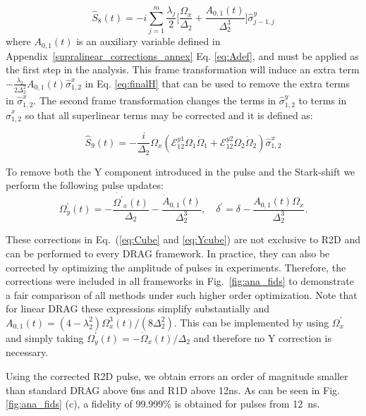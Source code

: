 \documentclass[superscriptaddress,amsmath,amssymb,aps,twocolumn,praplied,notitlepage]{revtex4-2}
\begin{document}
\begin{equation}
    \hat{S}_{8}(t) = -i\sum_{j=1}^{m} \frac{\lambda_j}{2}  \bigg[\frac{\Omega_x}{\Delta_2}+\frac{A_{0,1}(t)}{\Delta_2^3}\bigg] \hat{\sigma}^y_{j-1, j}
    \label{eq:Agenerator}
\end{equation}
where $A_{0,1}(t)$ is an auxiliary variable defined in  Appendix~\ref{supralinear_corrections_annex} Eq. \ref{eq:Adef}, and must be applied as the first step in the analysis. This frame transformation will induce an extra term $-\frac{\lambda_2}{2\Delta_2^2} A_{0,1}(t) \hat{\sigma}_{1,2}^x$ in Eq. \ref{eq:finalH} that can be used to remove the extra terms in $\hat{\sigma}_{1,2}^x$.
The second frame transformation changes the terms in $\hat{\sigma}_{1,2}^y$ to terms in $\hat{\sigma}_{1,2}^x$ so that all superlinear terms may be corrected and it is defined as:

\begin{equation}
    \hat{S}_{9}(t)=-\frac{i}{\Delta_2}\Omega_x(\mathcal{E}^{y1}_{12}\Omega_1\dot\Omega_1+\mathcal{E}^{y2}_{12}\Omega_2\dot\Omega_2)\hat{\sigma}_{1,2}^x
    \label{eq:Aswitch}
\end{equation}

To remove both the Y component introduced in the pulse and the Stark-shift we perform the following pulse updates:
\begin{equation}
    \Omega_y^{'}(t)=-\frac{\dot{\Omega^{'}}_x(t)}{\Delta_2}-\frac{\dot{A}_{0,1}(t)}{\Delta_2^3},\quad \delta^{'}=\delta-\frac{A_{0,1}(t)\Omega_x}{\Delta_2^3}.
    \label{eq:Ycube}
\end{equation}

These corrections in Eq.~(\ref{eq:Cube} and \ref{eq:Ycube}) are not exclusive to R2D and can be performed to every DRAG framework. In practice, they can also be corrected by optimizing the amplitude of pulses in experiments. Therefore, the corrections were included in all frameworks in Fig.~\ref{fig:ana_fids} to demonstrate a fair comparison of all methods under such higher order optimization. Note that for linear DRAG these expressions simplify substantially and $A_{0,1}(t)= (4-\lambda_2^2)\Omega_x^3(t)/(8\Delta_2^2)$. This can be implemented by using $\Omega_x^{'}$ and simply taking $\Omega_y^{'}(t)=-\dot{\Omega}_x(t)/\Delta_2$ and therefore no Y correction is necessary.
 
 Using the corrected R2D pulse, we obtain errors an order of magnitude smaller than standard DRAG above 6ns and R1D above 12ns.  
 As can be seen in Fig. \ref{fig:ana_fids} (c), a fidelity of 99.999\% is obtained for pulses from 12~ns. 
\end{document}

